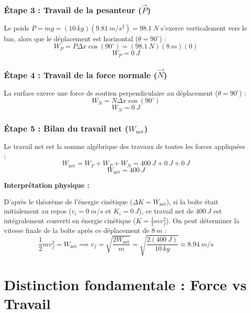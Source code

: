 \documentclass[11pt,openany]{book}
\begin{document}
\subsubsection*{Étape 3 : Travail de la pesanteur ($\vec{P}$)}

Le poids $P = mg = (\SI{10}{kg})(\SI{9.81}{m/s^2}) = \SI{98.1}{N}$ s'exerce verticalement vers le bas, alors que le déplacement est horizontal ($\theta = 90^\circ$) :
\[
W_P = P \Delta x \cos(90^\circ) = (\SI{98.1}{N})(\SI{8}{m})(0)
\]
\[
\boxed{W_P = \SI{0}{J}}
\]

\subsubsection*{Étape 4 : Travail de la force normale ($\vec{N}$)}

La surface exerce une force de soutien perpendiculaire au déplacement ($\theta = 90^\circ$) :
\[
W_N = N \Delta x \cos(90^\circ)
\]
\[
\boxed{W_N = \SI{0}{J}}
\]

\subsubsection*{Étape 5 : Bilan du travail net ($W_{\text{net}}$)}

Le travail net est la somme algébrique des travaux de toutes les forces appliquées :
\[
W_{\text{net}} = W_F + W_P + W_N = \SI{400}{J} + \SI{0}{J} + \SI{0}{J}
\]
\[
\boxed{W_{\text{net}} = \SI{400}{J}}
\]

\begin{important}
\textbf{Interprétation physique :} 

D'après le théorème de l'énergie cinétique ($\Delta K = W_{\text{net}}$), si la boîte était initialement au repos ($v_i = \SI{0}{m/s}$ et $K_i = \SI{0}{J}$), ce travail net de $\SI{400}{J}$ est intégralement converti en énergie cinétique ($K = \frac{1}{2}mv_f^2$). On peut déterminer la vitesse finale de la boîte après ce déplacement de $\SI{8}{m}$ :
\[
\frac{1}{2} m v_f^2 = W_{\text{net}} \implies v_f = \sqrt{\frac{2 W_{\text{net}}}{m}} = \sqrt{\frac{2(\SI{400}{J})}{\SI{10}{kg}}} \approx \SI{8.94}{m/s}
\]
\end{important}

\section{Distinction fondamentale : Force vs Travail}
\end{document}
